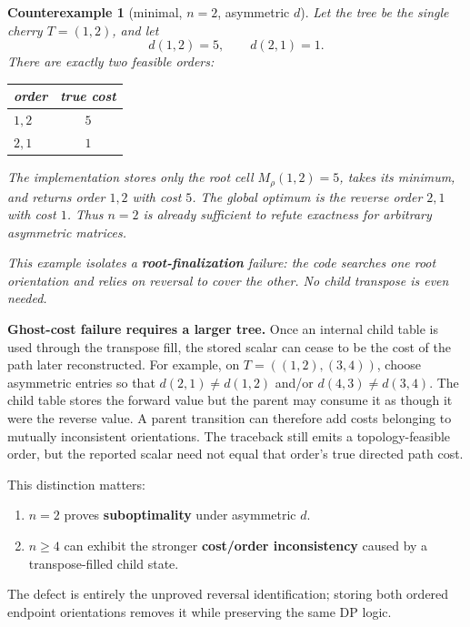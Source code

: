 \documentclass[11pt]{article}
\theoremstyle{plain}
\newtheorem{counterexample}[theorem]{Counterexample}
\begin{document}
\begin{counterexample}[minimal, \(n=2\), asymmetric \(d\)]\label{ce:3.4}
Let the tree be the single cherry \(T=(1,2)\), and let
\[
d(1,2)=5, \qquad d(2,1)=1.
\]
There are exactly two feasible orders:

\begin{center}
\begin{tabular}{lc}
\toprule
order & true cost \\
\midrule
\(1,2\) & \(5\) \\
\(2,1\) & \(1\) \\
\bottomrule
\end{tabular}
\end{center}

The implementation stores only the root cell \(M_\rho(1,2)=5\), takes its
minimum, and returns order \(1,2\) with cost \(5\). The global optimum is the
reverse order \(2,1\) with cost \(1\). Thus \(n=2\) is already sufficient to
refute exactness for arbitrary asymmetric matrices.

This example isolates a \textbf{root-finalization} failure: the code searches
one root orientation and relies on reversal to cover the other. No child
transpose is even needed.
\end{counterexample}

\textbf{Ghost-cost failure requires a larger tree.} Once an internal child
table is used through the transpose fill, the stored scalar can cease to be the
cost of the path later reconstructed. For example, on \(T=((1,2),(3,4))\),
choose asymmetric entries so that \(d(2,1)\neq d(1,2)\) and/or
\(d(4,3)\neq d(3,4)\). The child table stores the forward value but the parent
may consume it as though it were the reverse value. A parent transition can
therefore add costs belonging to mutually inconsistent orientations. The
traceback still emits a topology-feasible order, but the reported scalar need
not equal that order's true directed path cost.

This distinction matters:

\begin{enumerate}[label=\arabic*.]
\item \(n=2\) proves \textbf{suboptimality} under asymmetric \(d\).
\item \(n\ge 4\) can exhibit the stronger \textbf{cost/order inconsistency}
  caused by a transpose-filled child state.
\end{enumerate}

The defect is entirely the unproved reversal identification; storing both
ordered endpoint orientations removes it while preserving the same DP logic.
\end{document}
